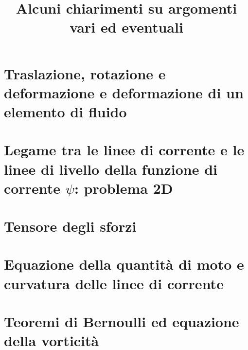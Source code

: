 \documentclass[11pt,fleqn]{article}
\title{Alcuni chiarimenti su argomenti vari ed eventuali}
\begin{document}
\maketitle

\tableofcontents


\section{Traslazione, rotazione e deformazione e deformazione di un elemento di fluido}

\clearpage \newpage

\section{Legame tra le linee di corrente e le linee di livello della funzione di corrente $\psi$: problema 2D}

\clearpage \newpage

\section{Tensore degli sforzi}

\clearpage \newpage

\section{Equazione della quantità di moto e curvatura delle linee di corrente}

\clearpage \newpage

\section{Teoremi di Bernoulli ed equazione della vorticità}

\clearpage \newpage
\end{document}
